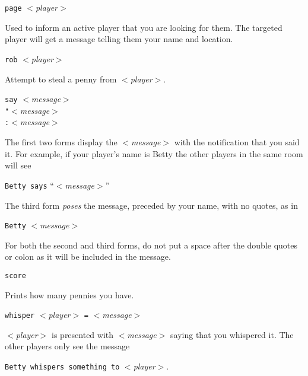 \begin{simple}
\dorule

\item[]
\begin{flushleft}
{\tt page} $<${\em player\/}$>$
\end{flushleft}
Used to inform an active player that you are looking for them.  The
targeted player will get a message telling them your name and
location.

\dorule

\item[]
\begin{flushleft}
{\tt rob} $<${\em player\/}$>$
\end{flushleft}
Attempt to steal a penny from $<${\em player\/}$>$.

\dorule

\item[]
\begin{flushleft}
{\tt say} $<${\em message\/}$>$ \\
\verb|"|$<${\em message\/}$>$ \\
\verb|:|$<${\em message\/}$>$
\end{flushleft}
The first two forms display the $<${\em message\/}$>$ with the
notification that you said it.  For example, if your player's name is
Betty the other players in the same room will see
\begin{flushleft}
{\tt Betty says} ``$<${\em message\/}$>$''
\end{flushleft}
The third form {\sl poses} the message, preceded by your name, with no
quotes, as in
\begin{flushleft}
{\tt Betty} $<${\em message\/}$>$
\end{flushleft}
For both the second and third forms, do not put a space after
the double quotes or colon as it will be included in the message.

\dorule

\item[]
\begin{flushleft}
{\tt score}
\end{flushleft}
Prints how many pennies you have.

\dorule

\item[]
\begin{flushleft}
{\tt whisper} $<${\em player\/}$>$ \verb|=| $<${\em message\/}$>$
\end{flushleft}
$<${\em player\/}$>$ is presented with $<${\em message\/}$>$ saying
that you whispered it.  The other players only see the message
\begin{flushleft}
{\tt Betty whispers something to} $<${\em player\/}$>$.
\end{flushleft}

\end{simple}

